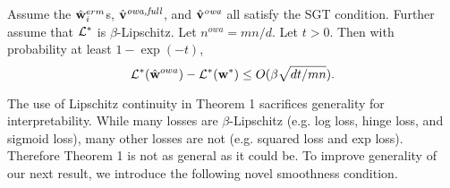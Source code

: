 \documentclass[thesis.tex]{subfiles}
\newcommand{\qhi}{\alpha_\text{hi}}
\newcommand{\qlo}{\alpha_\text{lo}}
\newcommand{\nowa}{n^{\textit{owa}}}
\begin{document}
\begin{theorem}
Assume the $\hat{\mathbf w}^{erm}_i$s, $\hat{\mathbf{v}}^{\textit{owa,full}}$, and $\hat{\mathbf{v}}^{\textit{owa}}$ all satisfy the SGT condition.
Further assume that $\mathcal{L}^*$ is $\beta$-Lipschitz.
Let $\nowa=mn/d$.
Let $t>0$.
Then with probability at least $1-\exp(-t)$,
\begin{equation}
    \mathcal{L}^*(\hat{\mathbf w}^{owa})-\mathcal{L}^*({\mathbf w^{*}})
    \le O(\beta\sqrt{dt/mn}).
\end{equation}
\end{theorem}
The use of Lipschitz continuity in Theorem 1 sacrifices generality for interpretability.
While many losses are $\beta$-Lipschitz (e.g. log loss, hinge loss, and sigmoid loss),
many other losses are not (e.g. squared loss and exp loss).
Therefore Theorem 1 is not as general as it could be.
To improve generality of our next result, we introduce the following novel smoothness condition.

%
%
%
%
\end{document}

